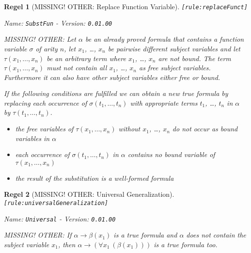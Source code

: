 \documentclass[a4paper,german,10pt,twoside]{book}
\newtheorem{rul}{Regel}
\theoremstyle{definition}
\theoremstyle{remark}
\begin{document}
\begin{rul}[MISSING! OTHER: Replace Function Variable]
\label{rule:replaceFunct} \hypertarget{rule:replaceFunct}{}
{\tt \tiny [\verb]rule:replaceFunct]]}

\par
{\em   Name: \verb]SubstFun]  -  Version: \verb]0.01.00]}


MISSING! OTHER: Let $\alpha$ be an already proved formula that contains a function variable $\sigma$ of arity $n$, let $x_1$, \ldots, $x_n$ be pairwise different subject variables and let $\tau(x_1, \ldots, x_n)$ be an arbitrary term where $x_1$, \ldots, $x_n$ are not bound. 
The term $\tau(x_1, \ldots, x_n)$ must not contain all $x_1$, \ldots, $x_n$ as free subject variables. Furthermore it can also have other subject variables either free or bound. 

If the following conditions are fulfilled we can obtain a new true formula by replacing each occurrence of $\sigma(t_1, \ldots, t_n)$ with appropriate terms $t_1$, \ldots, $t_n$ in $\alpha$ by $\tau(t_1, \ldots, t_n)$.

\begin{itemize}

\item 
the free variables of $\tau(x_1, \ldots, x_n)$ without $x_1$, \ldots, $x_n$ do not occur as bound variables in $\alpha$

\item
each occurrence of $\sigma(t_1, \ldots, t_n)$ in $\alpha$ contains no bound variable of $\tau(x_1, \ldots, x_n)$

\item
the result of the substitution is a well-formed formula
                  
\end{itemize}
\end{rul}


\begin{rul}[MISSING! OTHER: Universal Generalization]
\label{rule:universalGeneralization} \hypertarget{rule:universalGeneralization}{}
{\tt \tiny [\verb]rule:universalGeneralization]]}

\par
{\em   Name: \verb]Universal]  -  Version: \verb]0.01.00]}


MISSING! OTHER: If $\alpha \rightarrow \beta(x_1)$ is a true formula and $\alpha$ does not contain the subject variable $x_1$, then $\alpha \rightarrow (\forall x_1~(\beta(x_1)))$ is a true 
formula too.
\end{rul}
\end{document}
